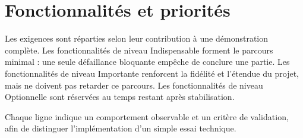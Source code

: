 \documentclass[11pt,a4paper]{article}
\newcommand{\essential}{\textcolor{priorityHigh}{Indispensable}}
\newcommand{\important}{\textcolor{priorityMedium}{Importante}}
\newcommand{\optional}{\textcolor{priorityLow}{Optionnelle}}
\begin{document}
\clearpage
\section{Fonctionnalités et priorités}

Les exigences sont réparties selon leur contribution à une démonstration complète. Les fonctionnalités de niveau \essential{} forment le parcours minimal : une seule défaillance bloquante empêche de conclure une partie. Les fonctionnalités de niveau \important{} renforcent la fidélité et l'étendue du projet, mais ne doivent pas retarder ce parcours. Les fonctionnalités de niveau \optional{} sont réservées au temps restant après stabilisation.

Chaque ligne indique un comportement observable et un critère de validation, afin de distinguer l'implémentation d'un simple essai technique.
\end{document}
